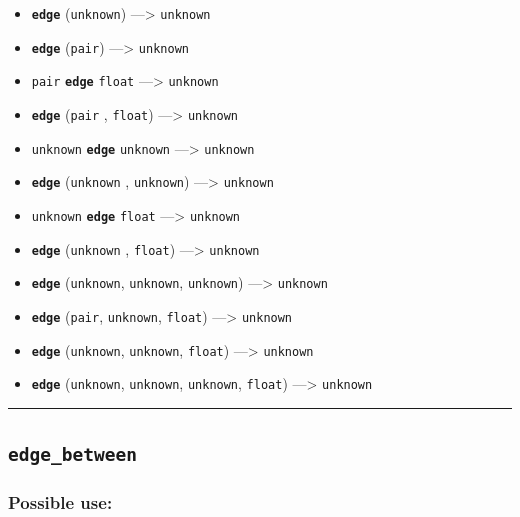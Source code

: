 \documentclass[]{book}
\providecommand{\tightlist}{%
  \setlength{\itemsep}{0pt}\setlength{\parskip}{0pt}}
\theoremstyle{definition}
\theoremstyle{definition}
\theoremstyle{definition}
\theoremstyle{remark}
\begin{document}
\begin{itemize}
\tightlist
\item
  \textbf{\texttt{edge}} (\texttt{unknown}) ---\textgreater{}
  \texttt{unknown}
\item
  \textbf{\texttt{edge}} (\texttt{pair}) ---\textgreater{}
  \texttt{unknown}
\item
  \texttt{pair} \textbf{\texttt{edge}} \texttt{float} ---\textgreater{}
  \texttt{unknown}
\item
  \textbf{\texttt{edge}} (\texttt{pair} , \texttt{float})
  ---\textgreater{} \texttt{unknown}
\item
  \texttt{unknown} \textbf{\texttt{edge}} \texttt{unknown}
  ---\textgreater{} \texttt{unknown}
\item
  \textbf{\texttt{edge}} (\texttt{unknown} , \texttt{unknown})
  ---\textgreater{} \texttt{unknown}
\item
  \texttt{unknown} \textbf{\texttt{edge}} \texttt{float}
  ---\textgreater{} \texttt{unknown}
\item
  \textbf{\texttt{edge}} (\texttt{unknown} , \texttt{float})
  ---\textgreater{} \texttt{unknown}
\item
  \textbf{\texttt{edge}} (\texttt{unknown}, \texttt{unknown},
  \texttt{unknown}) ---\textgreater{} \texttt{unknown}
\item
  \textbf{\texttt{edge}} (\texttt{pair}, \texttt{unknown},
  \texttt{float}) ---\textgreater{} \texttt{unknown}
\item
  \textbf{\texttt{edge}} (\texttt{unknown}, \texttt{unknown},
  \texttt{float}) ---\textgreater{} \texttt{unknown}
\item
  \textbf{\texttt{edge}} (\texttt{unknown}, \texttt{unknown},
  \texttt{unknown}, \texttt{float}) ---\textgreater{} \texttt{unknown}
\end{itemize}

\begin{center}\rule{0.5\linewidth}{\linethickness}\end{center}

\subsection{\texorpdfstring{\texttt{edge\_between}}{edge\_between}}\label{edge_between}

\subsubsection{Possible use:}\label{possible-use-145}
\end{document}

